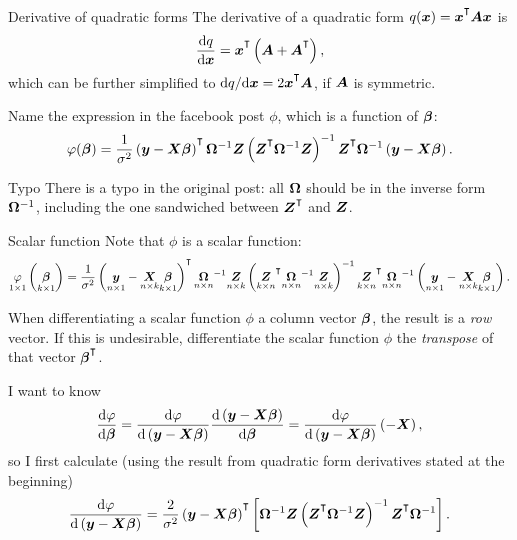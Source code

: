 \newpage

\begin{know}{Derivative of quadratic forms}
  \abovedisplayshortskip=0pt
  \belowdisplayshortskip=0pt
  \abovedisplayskip=0pt
  \belowdisplayskip=0pt
The derivative of a quadratic form $q(\m{x}) = \T{x}\m{A}\m{x}$ is
\begin{equation*}
  \frac{\dd q}{\dd \m{x}} = \T{x} \left( \m{A} + \T{A} \right),
\end{equation*}
which can be further simplified to $ \dd q / \dd \m{x} = 2\T{x}\m{A}$, if $\boldsymbol{A}$ is symmetric.
\end{know}

Name the expression in the facebook post $\phi$, which is a function of $\boldsymbol{\beta}$:
\begin{equation*}
  \phi(\m{\beta}) = \frac{1}{\sigma^2}\left( \m{y} - \m{X}\m{\beta} \right)\Ts \inv{\Omega} \m{Z} \left( \T{Z} \inv{\Omega} \m{Z} \right)^{-1} \T{Z} \inv{\Omega} \left( \m{y} - \m{X}\m{\beta} \right).
\end{equation*}

\begin{caution}{Typo}
There is a typo in the original post: all $\boldsymbol{\Omega}$ should be in the inverse form $\boldsymbol{\Omega}^{-1}$, including the one sandwiched between $\T{Z}$ and $\boldsymbol{Z}$.
\end{caution}

\begin{note}{Scalar function}
  \abovedisplayshortskip=0pt
  \belowdisplayshortskip=0pt
  \abovedisplayskip=0pt
  \belowdisplayskip=0pt
Note that $\phi$ is a scalar function:
\begin{equation*}
  \underset{1 \times 1}{\phi} \left( \md{\beta}{k}{1} \right) = \frac{1}{\sigma^2} \left( \md{y}{n}{1} - \md{X}{n}{k} \md{\beta}{k}{1} \right)\Ts \md{\Omega}{n}{n}^{-1} \md{Z}{n}{k} \left( \md{Z}{k}{n}\Ts \md{\Omega}{n}{n}^{-1} \md{Z}{n}{k} \right)^{-1} \md{Z}{k}{n}\Ts \md{\Omega}{n}{n}^{-1} \left( \md{y}{n}{1} - \md{X}{n}{k} \md{\beta}{k}{1} \right).
\end{equation*}

\bigskip

When differentiating a scalar function $\phi$ \wrt a column vector $\boldsymbol{\beta}$, the result is a \emph{row} vector. If this is undesirable, differentiate the scalar function $\phi$ \wrt the \emph{transpose} of that vector $\T{\beta}$.
\end{note}

I want to know
\begin{equation*}
  \frac{\mathrm{d} \varphi}{\mathrm{d} \boldsymbol{\beta}} = \frac{\mathrm{d} \varphi}{\mathrm{d} \left( \boldsymbol{y} - \boldsymbol{X}\boldsymbol{\beta} \right)} \frac{\mathrm{d} \left( \boldsymbol{y} - \boldsymbol{X}\boldsymbol{\beta} \right)}{\mathrm{d} \boldsymbol{\beta}} = \frac{\mathrm{d} \varphi}{\mathrm{d} \left( \boldsymbol{y} - \boldsymbol{X}\boldsymbol{\beta} \right)} \left( -\boldsymbol{X} \right),
\end{equation*}
so I first calculate (using the result from quadratic form derivatives stated at the beginning)
\begin{equation*}
    \frac{\dd \phi}{\dd \left( \m{y} - \m{X}\m{\beta} \right)} =
      \frac{2}{\sigma^2} \left( \m{y} - \m{X}\m{\beta} \right)\Ts \left[ \inv{\Omega} \m{Z} \left( \T{Z} \inv{\Omega} \m{Z} \right)^{-1} \T{Z} \inv{\Omega} \right].
\end{equation*}

